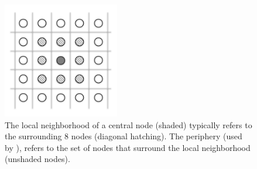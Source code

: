 \documentclass[gmdd, hvmath, online]{copernicus_discussions}
\begin{document}
\begin{figure}[H]
\begin{center}
\includegraphics[width=2in]{LocalNodeTypes.pdf}
\end{center}
\caption{The local neighborhood of a central node (shaded) typically refers to the surrounding 8 nodes (diagonal hatching).  The periphery (used by \cite{tsutsui1996simulated}), refers to the set of nodes that surround the local neighborhood (unshaded nodes).} \label{fig:LocalNodeTypes}
\end{figure}




\end{document}
